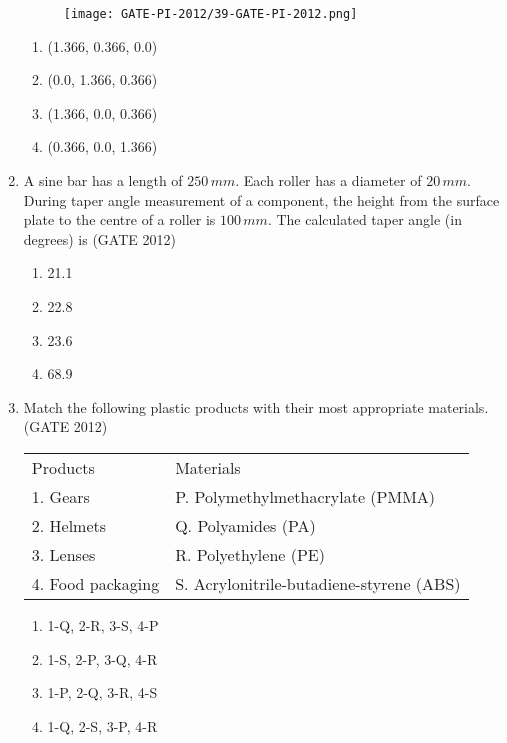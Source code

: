 \documentclass[journal,12pt,onecolumn]{IEEEtran}
\theoremstyle{remark}
\begin{document}
\begin{enumerate}
\begin{figure}[h!]
\centering
\texttt{[image: GATE-PI-2012/39-GATE-PI-2012.png]}
\caption{}
\label{q39}
\end{figure}

\begin{enumerate}
\item (1.366, 0.366, 0.0)
\item (0.0, 1.366, 0.366)
\item (1.366, 0.0, 0.366)
\item (0.366, 0.0, 1.366)
\end{enumerate}
\vspace{1cm}

\item A sine bar has a length of $250 \, mm$. Each roller has a diameter of $20 \, mm$. During taper angle measurement of a component, the height from the surface plate to the centre of a roller is $100 \, mm$. The calculated taper angle (in degrees) is
\hfill{(GATE 2012)}

\begin{enumerate}
\item 21.1
\item 22.8
\item 23.6
\item 68.9
\end{enumerate}
\vspace{1cm}

\item Match the following plastic products with their most appropriate materials. 
\hfill{(GATE 2012)}

\begin{tabular}{ll}
Products & Materials \\
1. Gears & P. Polymethylmethacrylate (PMMA) \\
2. Helmets & Q. Polyamides (PA) \\
3. Lenses & R. Polyethylene (PE) \\
4. Food packaging & S. Acrylonitrile-butadiene-styrene (ABS) \\
\end{tabular}

\begin{enumerate}
\item  1-Q, 2-R, 3-S, 4-P
\item  1-S, 2-P, 3-Q, 4-R
\item  1-P, 2-Q, 3-R, 4-S
\item  1-Q, 2-S, 3-P, 4-R
\end{enumerate}
\vspace{1cm}


\end{enumerate}
\end{document}
